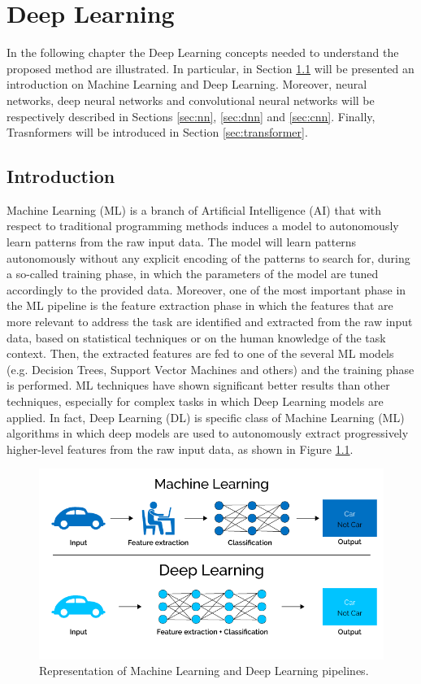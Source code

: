 \documentclass[binding=0.6cm,noexaminfo]{sapthesis}
\begin{document}
\chapter{Deep Learning}\label{cap:dl}

In the following chapter the Deep Learning concepts needed to understand the proposed method are illustrated. In particular, in Section \ref{sec:intro-dl} will be presented an introduction on Machine Learning and Deep Learning. Moreover, neural networks, deep neural networks and convolutional neural networks will be respectively described in Sections \ref{sec:nn}, \ref{sec:dnn} and \ref{sec:cnn}. Finally, Trasnformers will be introduced in Section \ref{sec:transformer}.

\section{Introduction}\label{sec:intro-dl}

Machine Learning (ML) is a branch of Artificial Intelligence (AI) that with respect to traditional programming methods induces a model to autonomously learn patterns from the raw input data. The model will learn patterns autonomously without any explicit encoding of the patterns to search for, during a so-called training phase, in which the parameters of the model are tuned accordingly to the provided data.
Moreover, one of the most important phase in the ML pipeline is the feature extraction phase in which the features that are more relevant to address the task are identified and extracted from the raw input data, based on statistical techniques or on the human knowledge of the task context. Then, the extracted features are fed to one of the several ML models (e.g. Decision Trees, Support Vector Machines and others) and the training phase is performed.
ML techniques have shown significant better results than other techniques, especially for complex tasks in which Deep Learning models are applied. In fact, Deep Learning (DL) is specific class of Machine Learning (ML) algorithms in which deep models are used to autonomously extract progressively higher-level features from the raw input data, as shown in Figure \ref{fig:dl-ml}.

\begin{figure}[h!]
\centering
\includegraphics[width=.7\linewidth]{dl}
\caption{Representation of Machine Learning and Deep Learning pipelines.}
\label{fig:dl-ml}
\end{figure}
\end{document}
